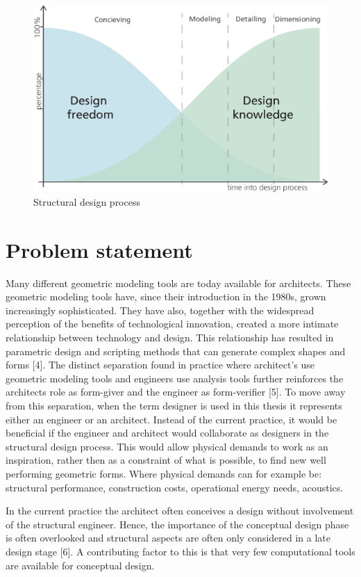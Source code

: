 \begin{figure}
  \includegraphics[width=350pt]{graphics/freedom-vs-knowledge.eps}
  \caption{Structural design process \cite{Mueller2014}}
  \label{fig:freedom-vs-knowledge}
\end{figure}

\section{Problem statement}
Many different geometric modeling tools are today available for architects. These geometric modeling tools have, since their introduction in the 1980s, grown increasingly sophisticated. They have also, together with the widespread perception of the benefits of technological innovation, created a more intimate relationship between technology and design. This relationship has resulted in parametric design and scripting methods that can generate complex shapes and forms [4]. The distinct separation found in practice where architect’s use geometric modeling tools and engineers use analysis tools further reinforces the architects role as form-giver and the engineer as form-verifier [5]. To move away from this separation, when the term designer is used in this thesis it represents either an engineer or an architect. Instead of the current practice, it would be beneficial if the engineer and architect would collaborate as designers in the structural design process. This would allow physical demands to work as an inspiration, rather then as a constraint of what is possible, to find new well performing geometric forms. Where physical demands can for example be: structural performance, construction costs, operational energy needs, acoustics.

In the current practice the architect often conceives a design without involvement of the structural engineer. Hence, the importance of the conceptual design phase is often overlooked and structural aspects are often only considered in a late design stage [6]. A contributing factor to this is that very few computational tools are available for conceptual design. 

